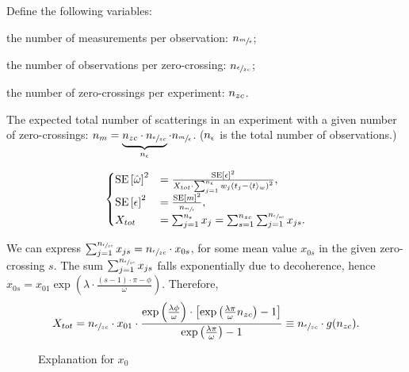 \documentclass{article}
\begin{document}
Define the following variables: \begin{inparaenum}
	\item the number of measurements per observation: $n_{\sfrac{m}{\epsilon}}$;
	\item the number of observations per zero-crossing: $n_{\sfrac{\epsilon}{zc}}$;
	\item the number of zero-crossings per experiment: $n_{zc}$.
\end{inparaenum}

The expected total number of scatterings in an experiment with a given number of zero-crossings: $n_m = \underbrace{n_{zc}\cdot n_{\sfrac{\epsilon}{zc}}}_{n_{\epsilon}}\cdot n_{\sfrac{m}{\epsilon}}$. ($n_{\epsilon}$ is the total number of observations.)

\begin{equation}
\begin{cases}
	\SE{\hat{\omega}}^2 &= \frac{\SE{\obs}^2}{X_{tot}\cdot\sum_{j=1}^{\No}w_j\bkt{t_j - \avg{t}_w}^2}, \\
	\SE{\obs}^2 &= \frac{\SE{\meas}^2}{\Nmo} ,\\
	X_{tot} &= \sum_{j=1}^{\No} x_j = \sum_{s=1}^{\Nzc}\sum_{j=1}^{\Nozc} x_{js}.
\end{cases}
\end{equation}

We can express $\sum_{j=1}^{n_{\sfrac{\epsilon}{zc}}} x_{js} = n_{\sfrac{\epsilon}{zc}} \cdot x_{0s}$, for some mean value $x_{0s}$ in the given zero-crossing $s$. The sum $\sum_{j=1}^{n_{\sfrac{\epsilon}{zc}}} x_{js}$ falls exponentially due to decoherence, hence $x_{0s} = x_{01}\exp{(\lambda\cdot \frac{(s-1)\cdot\pi - \phi}{\omega})}$. Therefore,
\[
	X_{tot} = \Nozc\cdot x_{01} \cdot \frac{\exp{\bkt{\frac{\lambda\phi}{\omega}}}\cdot\bkt*{\exp{\bkt{\frac{\lambda\pi}{\omega}\Nzc}}-1}}{\exp{\bkt{\frac{\lambda\pi}{\omega}}}-1} \equiv \Nozc \cdot g(\Nzc).
\]

\begin{figure}[h]
	\centering
	\caption{Explanation for $x_0$\label{fig:x0Expl}}
\end{figure}
\end{document}

